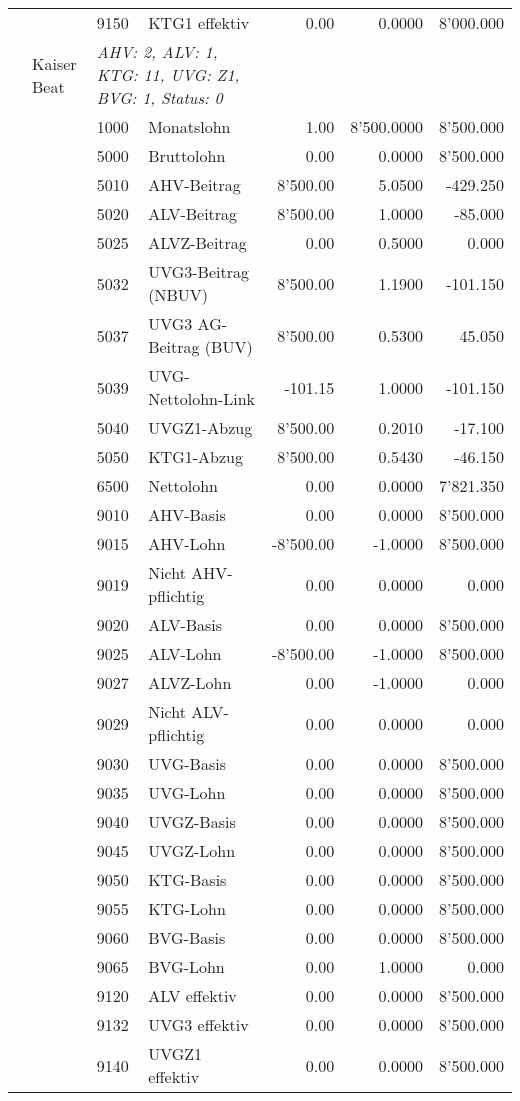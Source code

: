 \documentclass[15pt,a4paper]{article}
\begin{document}
\begin{longtable}{@{\extracolsep{\fill}}l l l l|r|r|r}
&&9150&KTG1 effektiv&0.00&0.0000&8'000.000\\
\pagebreak
14&Kaiser Beat&\multicolumn{2}{l|}{\small\emph{AHV: 2, ALV: 1, KTG: 11, UVG: Z1, BVG: 1, Status: 0}}&& \\
&&1000&Monatslohn&1.00&8'500.0000&8'500.000\\
&&5000&Bruttolohn&0.00&0.0000&8'500.000\\
&&5010&AHV-Beitrag&8'500.00&5.0500&-429.250\\
&&5020&ALV-Beitrag&8'500.00&1.0000&-85.000\\
&&5025&ALVZ-Beitrag&0.00&0.5000&0.000\\
&&5032&UVG3-Beitrag (NBUV)&8'500.00&1.1900&-101.150\\
&&5037&UVG3 AG-Beitrag (BUV)&8'500.00&0.5300&45.050\\
&&5039&UVG-Nettolohn-Link&-101.15&1.0000&-101.150\\
&&5040&UVGZ1-Abzug&8'500.00&0.2010&-17.100\\
&&5050&KTG1-Abzug&8'500.00&0.5430&-46.150\\
&&6500&Nettolohn&0.00&0.0000&7'821.350\\
&&9010&AHV-Basis&0.00&0.0000&8'500.000\\
&&9015&AHV-Lohn&-8'500.00&-1.0000&8'500.000\\
&&9019&Nicht AHV-pflichtig&0.00&0.0000&0.000\\
&&9020&ALV-Basis&0.00&0.0000&8'500.000\\
&&9025&ALV-Lohn&-8'500.00&-1.0000&8'500.000\\
&&9027&ALVZ-Lohn&0.00&-1.0000&0.000\\
&&9029&Nicht ALV-pflichtig&0.00&0.0000&0.000\\
&&9030&UVG-Basis&0.00&0.0000&8'500.000\\
&&9035&UVG-Lohn&0.00&0.0000&8'500.000\\
&&9040&UVGZ-Basis&0.00&0.0000&8'500.000\\
&&9045&UVGZ-Lohn&0.00&0.0000&8'500.000\\
&&9050&KTG-Basis&0.00&0.0000&8'500.000\\
&&9055&KTG-Lohn&0.00&0.0000&8'500.000\\
&&9060&BVG-Basis&0.00&0.0000&8'500.000\\
&&9065&BVG-Lohn&0.00&1.0000&0.000\\
&&9120&ALV effektiv&0.00&0.0000&8'500.000\\
&&9132&UVG3 effektiv&0.00&0.0000&8'500.000\\
&&9140&UVGZ1 effektiv&0.00&0.0000&8'500.000\\

\end{longtable}
\end{document}
